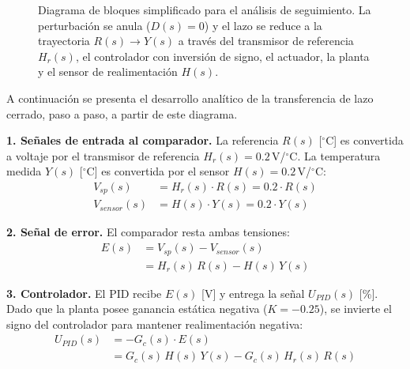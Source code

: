 \documentclass[journal,twocolumn]{IEEEtran}
\begin{document}
\begin{figure}[htbp]
{%
    }
    \shorthandon{<}
    \shorthandon{>}
    \caption{Diagrama de bloques simplificado para el análisis de seguimiento. La perturbación se anula ($D(s) = 0$) y el lazo se reduce a la trayectoria $R(s) \to Y(s)$ a través del transmisor de referencia $H_r(s)$, el controlador con inversión de signo, el actuador, la planta y el sensor de realimentación $H(s)$.}
    \label{fig:seguimiento}
\end{figure}

A continuación se presenta el desarrollo analítico de la transferencia de lazo cerrado, paso a paso, a partir de este diagrama.

\textbf{1. Señales de entrada al comparador.} La referencia $R(s)$ [$^\circ$C] es convertida a voltaje por el transmisor de referencia $H_r(s) = 0.2$\,V/$^\circ$C. La temperatura medida $Y(s)$ [$^\circ$C] es convertida por el sensor $H(s) = 0.2$\,V/$^\circ$C:
\begin{align}
    V_{sp}(s) &= H_r(s) \cdot R(s) = 0.2 \cdot R(s) \\
    V_{sensor}(s) &= H(s) \cdot Y(s) = 0.2 \cdot Y(s)
\end{align}

\textbf{2. Señal de error.} El comparador resta ambas tensiones:
\begin{align}
    E(s) &= V_{sp}(s) - V_{sensor}(s) \nonumber \\
         &= H_r(s)\,R(s) - H(s)\,Y(s)
\end{align}

\textbf{3. Controlador.} El PID recibe $E(s)$ [V] y entrega la señal $U_{PID}(s)$ [\%]. Dado que la planta posee ganancia estática negativa ($K = -0.25$), se invierte el signo del controlador para mantener realimentación negativa:
\begin{align}
    U_{PID}(s) &= -G_c(s) \cdot E(s) \nonumber \\
               &= G_c(s)\,H(s)\,Y(s) - G_c(s)\,H_r(s)\,R(s)
\end{align}
\end{document}
